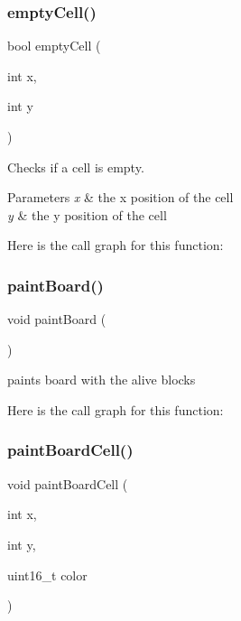 \subsubsection{\texorpdfstring{emptyCell()}{emptyCell()}}
{\footnotesize\ttfamily bool empty\+Cell (\begin{DoxyParamCaption}\item[{int}]{x,  }\item[{int}]{y }\end{DoxyParamCaption})}



Checks if a cell is empty. 


\begin{DoxyParams}{Parameters}
{\em x} & the x position of the cell \\
\hline
{\em y} & the y position of the cell \\
\hline
\end{DoxyParams}
Here is the call graph for this function\+:
\mbox{\label{group__board_ga7f29585bdde7d843e71f9f2c80c8543a}} 
\subsubsection{\texorpdfstring{paintBoard()}{paintBoard()}}
{\footnotesize\ttfamily void paint\+Board (\begin{DoxyParamCaption}{ }\end{DoxyParamCaption})}



paints board with the alive blocks 

Here is the call graph for this function\+:
\mbox{\label{group__board_gaca3eaa2f0cd1abf2f8cb0e6d80f0048f}} 
\subsubsection{\texorpdfstring{paintBoardCell()}{paintBoardCell()}}
{\footnotesize\ttfamily void paint\+Board\+Cell (\begin{DoxyParamCaption}\item[{int}]{x,  }\item[{int}]{y,  }\item[{uint16\+\_\+t}]{color }\end{DoxyParamCaption})}



